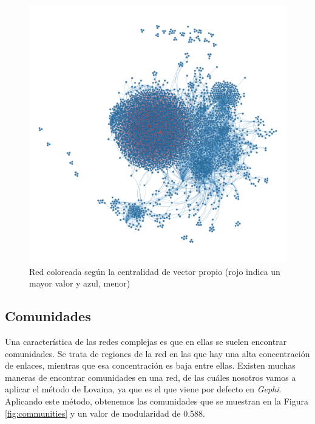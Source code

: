\begin{figure}
    \centering
    \includegraphics[width=\textwidth]{images/graph/eigenvector-centrality.png}
    \caption{Red coloreada según la centralidad de vector propio (rojo indica un mayor valor y azul, menor)}
    \label{fig:eigenvector-centrality-graph}
\end{figure}

\subsection{Comunidades}

Una característica de las redes complejas es que en ellas se suelen encontrar
comunidades. Se trata de regiones de la red en las que hay una alta
concentración de enlaces, mientras que esa concentración es baja entre ellas.
Existen muchas maneras de encontrar comunidades en una red, de las cuáles
nosotros vamos a aplicar el método de Lovaina, ya que es el que viene por
defecto en \textit{Gephi}. Aplicando este método, obtenemos las comunidades que
se muestran en la Figura \ref{fig:communities} y un valor de modularidad de
0.588.


